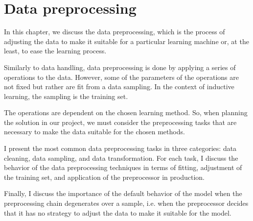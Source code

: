 \chapter{Data preprocessing}
\label{chap:preprocess}
\glsresetall


In this chapter, we discuss the data preprocessing, which is the process of adjusting the
data to make it suitable for a particular learning machine or, at the least, to ease the
learning process.

Similarly to data handling, data preprocessing is done by applying a series of operations
to the data.  However, some of the parameters of the operations are not fixed but rather
are fit from a data sampling.  In the context of inductive learning, the sampling is the
training set.

The operations are dependent on the chosen learning method.  So, when planning the
solution in our project, we must consider the preprocessing tasks that are necessary to
make the data suitable for the chosen methods.

I present the most common data preprocessing tasks in three categories: data cleaning,
data sampling, and data transformation.  For each task, I discuss the behavior of the data
preprocessing techniques in terms of fitting, adjustment of the training set, and
application of the preprocessor in production.

Finally, I discuss the importance of the default behavior of the model when the
preprocessing chain degenerates over a sample, i.e. when the preprocessor decides that it
has no strategy to adjust the data to make it suitable for the model.

